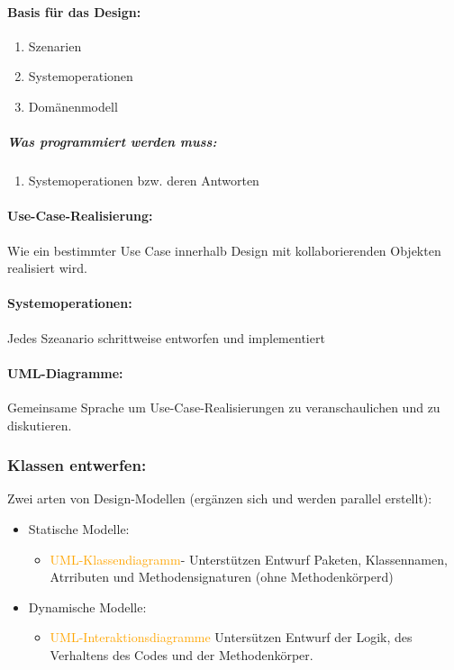\documentclass[../ZF_SWEN1.tex]{subfiles}
\begin{document}
\paragraph{Basis für das Design: }
\begin{enumerate}
	\item Szenarien
	\item Systemoperationen
	\item Domänenmodell
\end{enumerate}

\subparagraph{Was programmiert werden muss: }
\begin{enumerate}
	\item Systemoperationen bzw. deren Antworten
\end{enumerate}


\paragraph{Use-Case-Realisierung: } Wie ein bestimmter Use Case innerhalb Design mit kollaborierenden Objekten realisiert wird.

\paragraph{Systemoperationen: } Jedes Szeanario schrittweise entworfen und implementiert

\paragraph{UML-Diagramme: } Gemeinsame Sprache um Use-Case-Realisierungen zu veranschaulichen und zu diskutieren.


\subsubsection{Klassen entwerfen: }
Zwei arten von Design-Modellen (ergänzen sich und werden parallel erstellt):
\begin{itemize}
	\item Statische Modelle:
	\begin{itemize}
		\item \textcolor {orange}{UML-Klassendiagramm}- Unterstützen Entwurf Paketen, Klassennamen, Atrributen und Methodensignaturen (ohne Methodenkörperd)
	\end{itemize}
	\item Dynamische Modelle:
	\begin{itemize}
		\item \textcolor {orange} {UML-Interaktionsdiagramme} Untersützen Entwurf der Logik, des Verhaltens des Codes und der Methodenkörper.
	\end{itemize}	
\end{itemize}
\end{document}

